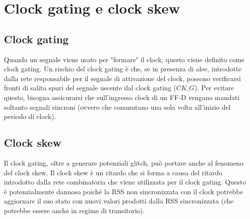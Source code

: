 \documentclass{subfiles}
\begin{document}
\section{Clock gating e clock skew}

\subsection{Clock gating}

Quando un segnale viene usato per "fermare" il clock, questo viene definito come clock gating.
Un rischio del clock gating è che, se in presenza di alee, introdotte dalla rete responsabile per il segnale di attivazione del clock, possono verificarsi fronti di salita spuri del segnale uscente dal clock gating ($CK\_G$).
Per evitare questo, bisogna assicurarsi che sull'ingresso clock di un FF-D vengano mandati soltanto segnali sincroni (ovvero che commutano una sola volta all'inizio del periodo di clock).

\subsection{Clock skew}

Il clock gating, oltre a generare potenziali glitch, può portare anche al fenomeno del clock skew.
Il clock skew è un ritardo che si forma a causa del ritardo introdotto dalla rete combinatoria che viene utilizzata per il clock gating.
Questo è potenzialmente dannoso poiché la RSS non sincronizzata con il clock potrebbe aggiornare il suo stato con nuovi valori prodotti dalla RSS sincronizzata (che potrebbe essere anche in regime di transitorio).
\end{document}
